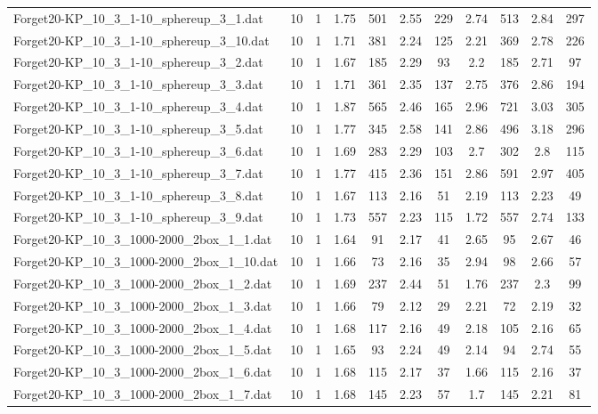 \begin{table}[!ht]
\begin{tabular}{lcccccccccc}
Forget20-KP\_10\_3\_1-10\_sphereup\_3\_1.dat & 10 & 1 & 1.75 & 501 & 2.55 & 229 & 2.74 & 513 & 2.84 & 297 \\
Forget20-KP\_10\_3\_1-10\_sphereup\_3\_10.dat & 10 & 1 & 1.71 & 381 & 2.24 & 125 & 2.21 & 369 & 2.78 & 226 \\
Forget20-KP\_10\_3\_1-10\_sphereup\_3\_2.dat & 10 & 1 & 1.67 & 185 & 2.29 & 93 & 2.2 & 185 & 2.71 & 97 \\
Forget20-KP\_10\_3\_1-10\_sphereup\_3\_3.dat & 10 & 1 & 1.71 & 361 & 2.35 & 137 & 2.75 & 376 & 2.86 & 194 \\
Forget20-KP\_10\_3\_1-10\_sphereup\_3\_4.dat & 10 & 1 & 1.87 & 565 & 2.46 & 165 & 2.96 & 721 & 3.03 & 305 \\
Forget20-KP\_10\_3\_1-10\_sphereup\_3\_5.dat & 10 & 1 & 1.77 & 345 & 2.58 & 141 & 2.86 & 496 & 3.18 & 296 \\
Forget20-KP\_10\_3\_1-10\_sphereup\_3\_6.dat & 10 & 1 & 1.69 & 283 & 2.29 & 103 & 2.7 & 302 & 2.8 & 115 \\
Forget20-KP\_10\_3\_1-10\_sphereup\_3\_7.dat & 10 & 1 & 1.77 & 415 & 2.36 & 151 & 2.86 & 591 & 2.97 & 405 \\
Forget20-KP\_10\_3\_1-10\_sphereup\_3\_8.dat & 10 & 1 & 1.67 & 113 & 2.16 & 51 & 2.19 & 113 & 2.23 & 49 \\
Forget20-KP\_10\_3\_1-10\_sphereup\_3\_9.dat & 10 & 1 & 1.73 & 557 & 2.23 & 115 & 1.72 & 557 & 2.74 & 133 \\
Forget20-KP\_10\_3\_1000-2000\_2box\_1\_1.dat & 10 & 1 & 1.64 & 91 & 2.17 & 41 & 2.65 & 95 & 2.67 & 46 \\
Forget20-KP\_10\_3\_1000-2000\_2box\_1\_10.dat & 10 & 1 & 1.66 & 73 & 2.16 & 35 & 2.94 & 98 & 2.66 & 57 \\
Forget20-KP\_10\_3\_1000-2000\_2box\_1\_2.dat & 10 & 1 & 1.69 & 237 & 2.44 & 51 & 1.76 & 237 & 2.3 & 99 \\
Forget20-KP\_10\_3\_1000-2000\_2box\_1\_3.dat & 10 & 1 & 1.66 & 79 & 2.12 & 29 & 2.21 & 72 & 2.19 & 32 \\
Forget20-KP\_10\_3\_1000-2000\_2box\_1\_4.dat & 10 & 1 & 1.68 & 117 & 2.16 & 49 & 2.18 & 105 & 2.16 & 65 \\
Forget20-KP\_10\_3\_1000-2000\_2box\_1\_5.dat & 10 & 1 & 1.65 & 93 & 2.24 & 49 & 2.14 & 94 & 2.74 & 55 \\
Forget20-KP\_10\_3\_1000-2000\_2box\_1\_6.dat & 10 & 1 & 1.68 & 115 & 2.17 & 37 & 1.66 & 115 & 2.16 & 37 \\
Forget20-KP\_10\_3\_1000-2000\_2box\_1\_7.dat & 10 & 1 & 1.68 & 145 & 2.23 & 57 & 1.7 & 145 & 2.21 & 81 \\

\end{tabular}
\end{table}
